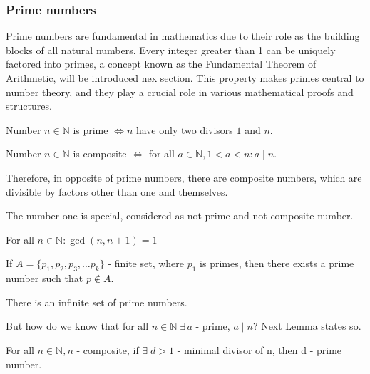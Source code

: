 \documentclass[../lecture-notes.tex]{subfiles}
\begin{document}
\subsubsection{Prime numbers}

Prime numbers are fundamental in mathematics due to their role as the building blocks of all natural numbers. Every integer greater than 1 can be uniquely factored into primes, a concept known as the Fundamental Theorem of Arithmetic, will be introduced nex section. This property makes primes central to number theory, and they play a crucial role in various mathematical proofs and structures.

\begin{definition}
    Number $n \in \mathbb{N}$ is prime $\iff n$ have only two divisors $1$ and $n$. 
\end{definition}

\begin{definition}
    Number $n \in \mathbb{N}$ is composite $\iff $ for all $a \in \mathbb{N}, 1 < a < n: a \mid n$.
\end{definition}

Therefore, in opposite of prime numbers, there are composite numbers, which are divisible by factors other than one and themselves.

\begin{remark}
    The number one is special, considered as not prime and not composite number.
\end{remark}

\begin{lemma}
    For all $n \in \mathbb{N}: \gcd(n, n+1) = 1$
\end{lemma}

\begin{theorem} 
    If $A = \{p_1, p_2, p_3, \dots p_k\}$ - finite set, where $p_1$ is primes, then there exists a prime number such that $p \notin A$.
\end{theorem}

\begin{corollary}
    There is an infinite set of prime numbers.
\end{corollary}

But how do we know that for all $n \in \mathbb{N} \; \exists \, a$ - prime, $a \mid n$? Next Lemma states so. 

\begin{lemma}
    For all $n \in \mathbb{N}, n$ - composite, if $\exists \; d > 1$ - minimal divisor of n, then d - prime number.
\end{lemma}
\end{document}
